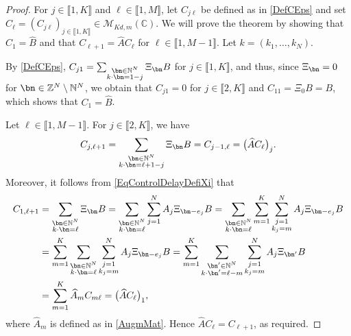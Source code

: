 \begin{proof}
For $j \in \llbracket 1, K\rrbracket$ and $\ell \in \llbracket 1, M\rrbracket$, let $C_{j\ell}$ be defined as in \eqref{DefCEps} and set $C_\ell = \left(C_{j\ell}\right)_{j \in \llbracket 1, K\rrbracket} \in \mathcal M_{Kd, m}(\mathbb C)$. We will prove the theorem by showing that $C_1 = \widehat B$ and that $C_{\ell + 1} = \widehat A C_\ell$ for $\ell \in \llbracket 1, M-1\rrbracket$. Let $k = (k_1, \dots, k_N)$.

By \eqref{DefCEps}, $C_{j1} = \sum_{\substack{\bn \in \mathbb N^N \\ k \cdot \bn = 1 - j}} \Xi_{\bn} B$ for $j \in \llbracket 1, K\rrbracket$, and thus, since $\Xi_{\bn} = 0$ for $\bn \in \mathbb Z^N \setminus \mathbb N^N$, we obtain that $C_{j1} = 0$ for $j \in \llbracket 2, K\rrbracket$ and $C_{11} = \Xi_{0} B = B$, which shows that $C_1 = \widehat B$.

Let $\ell \in \llbracket 1, M-1\rrbracket$. For $j \in \llbracket 2, K\rrbracket$, we have
\[
C_{j, \ell + 1} = \sum_{\substack{\bn \in \mathbb N^N \\ k \cdot \bn = \ell + 1 - j}} \Xi_{\bn} B = C_{j-1, \ell} =\bigl(\widehat A C_{\ell}\bigr)_j.
\]
Moreover, it follows from \eqref{EqControlDelayDefiXi} that
\begin{align*}
C_{1, \ell + 1} & = \sum_{\substack{\bn \in \mathbb N^N \\ k \cdot \bn = \ell}} \Xi_{\bn} B = \sum_{\substack{\bn \in \mathbb N^N \\ k \cdot \bn = \ell}} \sum_{j=1}^N A_j \Xi_{\bn - e_j} B {} = \sum_{\substack{\bn \in \mathbb N^N \\ k \cdot \bn = \ell}} \sum_{m=1}^K \sum_{\substack{j=1 \\ k_j = m}}^N A_j \Xi_{\bn - e_j} B  \\
& = \sum_{m=1}^K \sum_{\substack{\bn \in \mathbb N^N \\ k \cdot \bn = \ell}} \sum_{\substack{j=1 \\ k_j = m}}^N A_j \Xi_{\bn - e_j} B = \sum_{m=1}^K \sum_{\substack{\bn^\prime \in \mathbb N^N \\ k \cdot \bn^\prime = \ell - m}} \sum_{\substack{j=1 \\ k_j = m}}^N A_j \Xi_{\bn^\prime} B\\& = \sum_{m=1}^K \widehat A_m C_{m\ell} = \bigl(\widehat A C_{\ell}\bigr)_1,
\end{align*}
where $\widehat A_m$ is defined as in \eqref{AugmMat}. Hence $\widehat A C_\ell = C_{\ell + 1}$, as required.
\end{proof}

